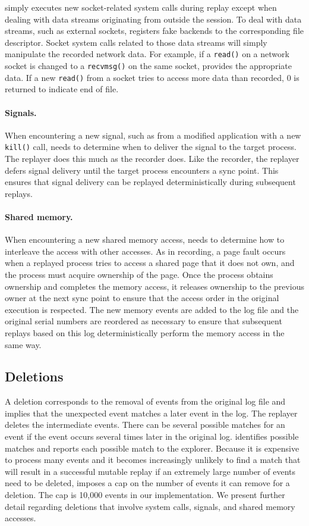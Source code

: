 {\dora} simply executes new socket-related system calls during replay
except when dealing with data streams originating from outside the
session.  To deal with data streams, such as
external sockets, {\dora} registers fake backends to the
corresponding file descriptor.
Socket system calls related to those data streams will simply
manipulate the recorded network data.  For example, if a {\tt read()}
on a network socket is changed to a {\tt recvmsg()} on the same
socket, {\dora} provides the appropriate
data. If a new {\tt read()} from a socket tries to access
more data than recorded, $0$ is returned to indicate end of file. 

\paragraph{Signals.}
When encountering a new signal, such as from a modified application
with a new {\tt kill()} call, {\dora} needs to determine when to
deliver the signal to the target process.
The replayer does this much as the recorder does.
Like the recorder, the replayer
defers signal delivery until the target process encounters a sync point. This
ensures that signal delivery can be replayed deterministically during subsequent
replays.

\paragraph{Shared memory.}
When encountering a new shared memory access, {\dora} needs to
determine how to interleave the access with other accesses.
As in recording,
a page fault occurs
when a replayed
process tries to access a shared page that it does not own,
and the process must acquire
ownership of the page.  Once the process obtains ownership and
completes the memory access, it releases ownership to the previous owner at the
next sync point to ensure that the access order in the original execution is
respected.  The new memory events are added to the log file and the
original serial numbers are reordered as necessary to ensure that
subsequent replays based on this log deterministically perform the
memory access in the same way.

\subsection{Deletions}
A deletion corresponds to the removal of events from the original log
file and implies that the unexpected event matches a later event in the
log. The replayer deletes the intermediate events.  There can be
several possible matches for an event if the event occurs several
times later in the original log.  {\dora} identifies
possible matches and reports each possible match to the explorer. Because it is
expensive to process many events and it becomes increasingly unlikely
to find a match that will result in a successful mutable replay if an
extremely large number of events need to be deleted, {\dora}
imposes a cap on the number of events it can remove for a deletion.
The cap is 10,000 events in our implementation.  We present
further detail regarding deletions that involve system calls,
signals, and shared memory accesses.

